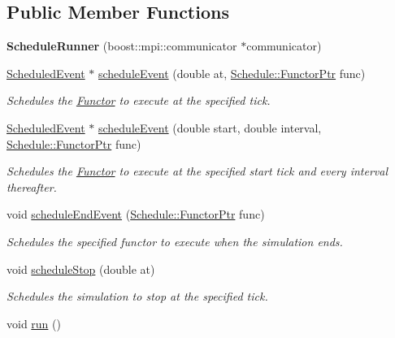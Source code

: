 \subsection*{Public Member Functions}
\begin{DoxyCompactItemize}
\item 
\hypertarget{classrepast_1_1_schedule_runner_a8f6c2ec10771a85c358e27c6fced69e8}{{\bfseries Schedule\-Runner} (boost\-::mpi\-::communicator $\ast$communicator)}\label{classrepast_1_1_schedule_runner_a8f6c2ec10771a85c358e27c6fced69e8}

\item 
\hyperlink{classrepast_1_1_scheduled_event}{Scheduled\-Event} $\ast$ \hyperlink{classrepast_1_1_schedule_runner_a607b44e70ad07b8d62cdce1426fb2ddc}{schedule\-Event} (double at, \hyperlink{classrepast_1_1_schedule_a6a31b68f08a9bb28381ffe02b18f1df3}{Schedule\-::\-Functor\-Ptr} func)
\begin{DoxyCompactList}\small\item\em Schedules the \hyperlink{classrepast_1_1_functor}{Functor} to execute at the specified tick. \end{DoxyCompactList}\item 
\hyperlink{classrepast_1_1_scheduled_event}{Scheduled\-Event} $\ast$ \hyperlink{classrepast_1_1_schedule_runner_a7e043ad51b6f5f7eae71d479e0eae471}{schedule\-Event} (double start, double interval, \hyperlink{classrepast_1_1_schedule_a6a31b68f08a9bb28381ffe02b18f1df3}{Schedule\-::\-Functor\-Ptr} func)
\begin{DoxyCompactList}\small\item\em Schedules the \hyperlink{classrepast_1_1_functor}{Functor} to execute at the specified start tick and every interval thereafter. \end{DoxyCompactList}\item 
void \hyperlink{classrepast_1_1_schedule_runner_a52e62ccda4dc3288c90586d91701ed60}{schedule\-End\-Event} (\hyperlink{classrepast_1_1_schedule_a6a31b68f08a9bb28381ffe02b18f1df3}{Schedule\-::\-Functor\-Ptr} func)
\begin{DoxyCompactList}\small\item\em Schedules the specified functor to execute when the simulation ends. \end{DoxyCompactList}\item 
void \hyperlink{classrepast_1_1_schedule_runner_a86fa8a634ef091adeaa43d03b040060f}{schedule\-Stop} (double at)
\begin{DoxyCompactList}\small\item\em Schedules the simulation to stop at the specified tick. \end{DoxyCompactList}\item 
\hypertarget{classrepast_1_1_schedule_runner_afc5cb8954438ed0a9ff665396b2f2994}{void \hyperlink{classrepast_1_1_schedule_runner_afc5cb8954438ed0a9ff665396b2f2994}{run} ()}\label{classrepast_1_1_schedule_runner_afc5cb8954438ed0a9ff665396b2f2994}


\end{DoxyCompactItemize}
